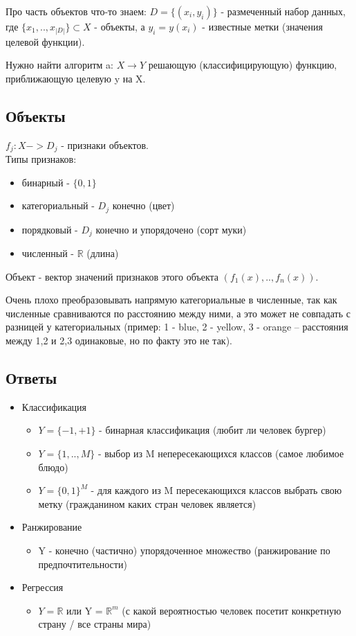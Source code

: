 \documentclass{amsart}
\begin{document}
Про часть объектов что-то знаем:
$D = \{(x_{i}, y_{i})\}$ - размеченный набор данных, где $\{x_{1}, .. , x_{|D|}\} 	\subset X$ - объекты, а $y_{i} = y(x_{i})$ - известные метки (значения целевой функции).

Нужно найти алгоритм a: $X \rightarrow Y$ решающую (классифицирующую) функцию, приближающую целевую y на X.


\subsection{Объекты}
\hfill \newline
$f_{j}: X -> D_{j}$ - признаки объектов. \\
Типы признаков:
\begin{itemize}
    \item бинарный - $\{0,1\}$
    \item категориальный - $D_{j}$ конечно (цвет)
    \item порядковый - $D_{j}$ конечно и упорядочено (сорт муки)
    \item численный - $\mathbb{R}$ (длина)
\end{itemize}

Объект - вектор значений признаков этого объекта $(f_{1}(x), .. , f_{n}(x))$.

Очень плохо преобразовывать напрямую категориальные в численные, так как численные сравниваются по расстоянию между ними, а это может не совпадать с разницей у категориальных (пример: 1 - blue, 2 - yellow, 3 - orange -- расстояния между 1,2 и 2,3 одинаковые, но по факту это не так).

\subsection{Ответы}
\begin{itemize}
    \item Классификация
        \begin{itemize}
            \item $Y = \{-1, +1\}$ - бинарная классификация (любит ли человек бургер)
            \item $Y = \{1, .. , M\}$ - выбор из M непересекающихся классов (самое любимое блюдо)
            \item $Y = \{0,1\}^{M}$ - для каждого из M пересекающихся классов выбрать свою метку (гражданином каких стран человек является)
        \end{itemize}
    \item Ранжирование
        \begin{itemize}
            \item Y - конечно (частично) упорядоченное множество (ранжирование по предпочтительности)
        \end{itemize} 
    \item Регрессия
        \begin{itemize}
            \item $Y = \mathbb{R}$ или Y = $\mathbb{R}^{m}$ (с какой вероятностью человек посетит конкретную страну / все страны мира)
        \end{itemize}
\end{itemize}
\end{document}
